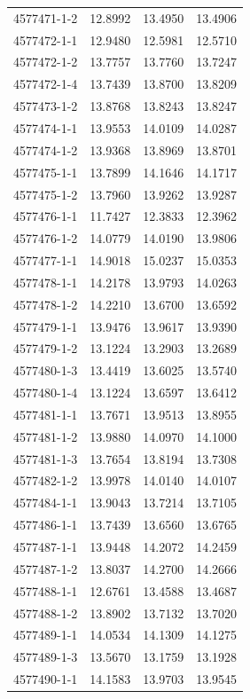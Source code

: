 \begin{longtable}{lrrr}
4577471-1-2 & 12.8992 & 13.4950 & 13.4906 \\
4577472-1-1 & 12.9480 & 12.5981 & 12.5710 \\
4577472-1-2 & 13.7757 & 13.7760 & 13.7247 \\
4577472-1-4 & 13.7439 & 13.8700 & 13.8209 \\
4577473-1-2 & 13.8768 & 13.8243 & 13.8247 \\
4577474-1-1 & 13.9553 & 14.0109 & 14.0287 \\
4577474-1-2 & 13.9368 & 13.8969 & 13.8701 \\
4577475-1-1 & 13.7899 & 14.1646 & 14.1717 \\
4577475-1-2 & 13.7960 & 13.9262 & 13.9287 \\
4577476-1-1 & 11.7427 & 12.3833 & 12.3962 \\
4577476-1-2 & 14.0779 & 14.0190 & 13.9806 \\
4577477-1-1 & 14.9018 & 15.0237 & 15.0353 \\
4577478-1-1 & 14.2178 & 13.9793 & 14.0263 \\
4577478-1-2 & 14.2210 & 13.6700 & 13.6592 \\
4577479-1-1 & 13.9476 & 13.9617 & 13.9390 \\
4577479-1-2 & 13.1224 & 13.2903 & 13.2689 \\
4577480-1-3 & 13.4419 & 13.6025 & 13.5740 \\
4577480-1-4 & 13.1224 & 13.6597 & 13.6412 \\
4577481-1-1 & 13.7671 & 13.9513 & 13.8955 \\
4577481-1-2 & 13.9880 & 14.0970 & 14.1000 \\
4577481-1-3 & 13.7654 & 13.8194 & 13.7308 \\
4577482-1-2 & 13.9978 & 14.0140 & 14.0107 \\
4577484-1-1 & 13.9043 & 13.7214 & 13.7105 \\
4577486-1-1 & 13.7439 & 13.6560 & 13.6765 \\
4577487-1-1 & 13.9448 & 14.2072 & 14.2459 \\
4577487-1-2 & 13.8037 & 14.2700 & 14.2666 \\
4577488-1-1 & 12.6761 & 13.4588 & 13.4687 \\
4577488-1-2 & 13.8902 & 13.7132 & 13.7020 \\
4577489-1-1 & 14.0534 & 14.1309 & 14.1275 \\
4577489-1-3 & 13.5670 & 13.1759 & 13.1928 \\
4577490-1-1 & 14.1583 & 13.9703 & 13.9545 \\

\end{longtable}
